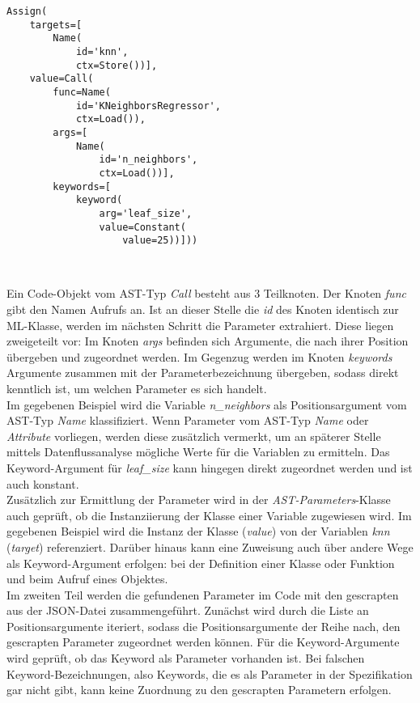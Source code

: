 \documentclass[german,bachelor]{swsLeipzig}
\begin{document}
\begin{lstlisting}[frame=single, basicstyle=\small]
Assign(
    targets=[
        Name(
            id='knn',
            ctx=Store())],
    value=Call(
        func=Name(
            id='KNeighborsRegressor',
            ctx=Load()),
        args=[
            Name(
                id='n_neighbors',
                ctx=Load())],
        keywords=[
            keyword(
                arg='leaf_size',
                value=Constant(
                    value=25))]))
\end{lstlisting}
\

Ein Code-Objekt vom AST-Typ \textit{Call} besteht aus 3 Teilknoten.
Der Knoten \textit{func} gibt den Namen Aufrufs an.
Ist an dieser Stelle die \textit{id} des Knoten identisch zur ML-Klasse, werden im nächsten Schritt die Parameter
extrahiert.
Diese liegen zweigeteilt vor:
Im Knoten \textit{args} befinden sich Argumente, die nach ihrer Position übergeben und zugeordnet werden.
Im Gegenzug werden im Knoten \textit{keywords} Argumente zusammen mit der Parameterbezeichnung übergeben, sodass direkt kenntlich
ist, um welchen Parameter es sich handelt. \\

Im gegebenen Beispiel wird die Variable \textit{n\_neighbors} als Positionsargument vom AST-Typ \textit{Name} klassifiziert.
Wenn Parameter vom AST-Typ \textit{Name} oder \textit{Attribute} vorliegen, werden diese zusätzlich vermerkt, um an späterer Stelle mittels
Datenflussanalyse mögliche Werte für die Variablen zu ermitteln.
Das Keyword-Argument für \textit{leaf\_size} kann hingegen direkt zugeordnet werden und ist auch konstant. \\

Zusätzlich zur Ermittlung der Parameter wird in der \textit{AST-Parameters}-Klasse auch geprüft, ob die Instanziierung der Klasse
einer Variable zugewiesen wird.
Im gegebenen Beispiel wird die Instanz der Klasse (\textit{value}) von der Variablen \textit{knn} (\textit{target}) referenziert.
Darüber hinaus kann eine Zuweisung auch über andere Wege als Keyword-Argument erfolgen:
bei der Definition einer Klasse oder Funktion und beim Aufruf eines Objektes.\\

Im zweiten Teil werden die gefundenen Parameter im Code mit den gescrapten aus der JSON-Datei zusammengeführt.
Zunächst wird durch die Liste an Positionsargumente iteriert, sodass die Positionsargumente der Reihe nach,
den gescrapten Parameter zugeordnet werden können.
Für die Keyword-Argumente wird geprüft, ob das Keyword als Parameter vorhanden ist.
Bei falschen Keyword-Bezeichnungen, also Keywords, die es als Parameter in der Spezifikation gar nicht gibt,
kann keine Zuordnung zu den gescrapten Parametern erfolgen. \\
\end{document}
